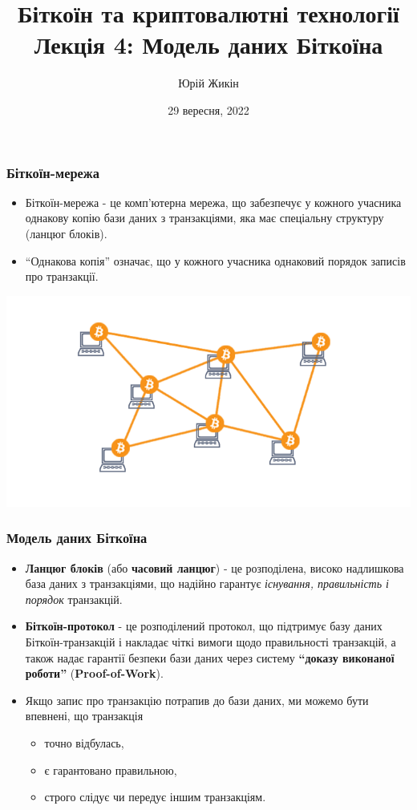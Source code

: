 \documentclass{beamer}
\title{
  Біткоїн та криптовалютні технології \\
  Лекція 4: Модель даних Біткоїна
}
\author{Юрій Жикін}
\date{29 вересня, 2022}
\begin{document}
\frame{\titlepage}

\begin{frame}
  \frametitle{Біткоїн-мережа}
  \begin{itemize}
  \item Біткоїн-мережа - це комп'ютерна мережа, що забезпечує у кожного учасника
    однакову копію бази даних з транзакціями, яка має спеціальну структуру
    (ланцюг блоків).
  \item ``Однакова копія'' означає, що у кожного учасника однаковий порядок 
    записів про транзакції.
  \end{itemize}
  \includegraphics[width=\textwidth]{network}
\end{frame}

\begin{frame}
  \frametitle{Модель даних Біткоїна}
  \begin{itemize}
  \item \textbf{Ланцюг блоків} (або \textbf{часовий ланцюг}) - це розподілена,
    високо надлишкова база даних з транзакціями, що надійно гарантує
    \textit{існування, правильність і порядок} транзакцій.
  \item \textbf{Біткоїн-протокол} - це розподілений протокол, що підтримує базу
    даних Біткоїн-транзакцій і накладає чіткі вимоги щодо правильності
    транзакцій, а також надає гарантії безпеки бази даних через систему \textbf{``доказу
    виконаної роботи''} (\textbf{Proof-of-Work}).
  \item Якщо запис про транзакцію потрапив до бази даних, ми можемо бути впевнені,
    що транзакція
    \begin{itemize}
    \item точно відбулась,
    \item є гарантовано правильною,
    \item строго слідує чи передує іншим транзакціям.
    \end{itemize}
  \end{itemize}
\end{frame}
\end{document}
